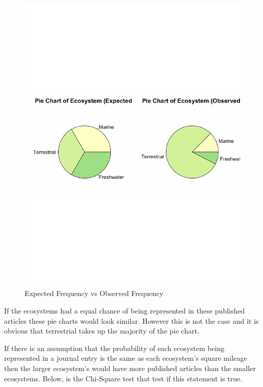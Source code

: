 \documentclass[
]{article}
\begin{document}
\begin{figure}
  \caption{Expected Frequency vs Observed Frequency}
    \includegraphics[width=13cm]{pie-eco-1.pdf}
\end{figure}

If the ecosystems had a equal chance of being represented in these
published articles these pie charts would look similar. However this is
not the case and it is obvious that terrestrial takes up the majority of
the pie chart.

If there is an assumption that the probability of each ecosystem being
represented in a journal entry is the same as each ecosystem's square
mileage then the larger ecosystem's would have more published articles
than the smaller ecosystems. Below, is the Chi-Square test that test if
this statement is true.
\end{document}
